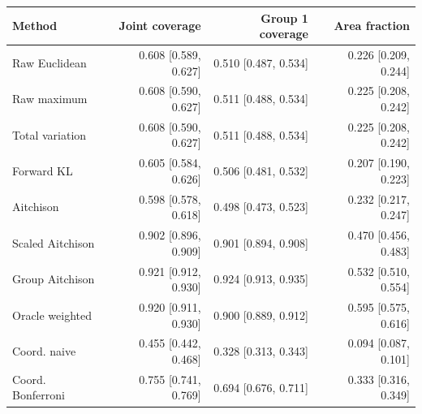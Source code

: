 \begin{tabular}{lrrr}
\toprule
Method & Joint coverage & Group 1 coverage & Area fraction \\
\midrule
Raw Euclidean & 0.608 [0.589, 0.627] & 0.510 [0.487, 0.534] & 0.226 [0.209, 0.244] \\
Raw maximum & 0.608 [0.590, 0.627] & 0.511 [0.488, 0.534] & 0.225 [0.208, 0.242] \\
Total variation & 0.608 [0.590, 0.627] & 0.511 [0.488, 0.534] & 0.225 [0.208, 0.242] \\
Forward KL & 0.605 [0.584, 0.626] & 0.506 [0.481, 0.532] & 0.207 [0.190, 0.223] \\
Aitchison & 0.598 [0.578, 0.618] & 0.498 [0.473, 0.523] & 0.232 [0.217, 0.247] \\
Scaled Aitchison & 0.902 [0.896, 0.909] & 0.901 [0.894, 0.908] & 0.470 [0.456, 0.483] \\
Group Aitchison & 0.921 [0.912, 0.930] & 0.924 [0.913, 0.935] & 0.532 [0.510, 0.554] \\
Oracle weighted & 0.920 [0.911, 0.930] & 0.900 [0.889, 0.912] & 0.595 [0.575, 0.616] \\
Coord. naive & 0.455 [0.442, 0.468] & 0.328 [0.313, 0.343] & 0.094 [0.087, 0.101] \\
Coord. Bonferroni & 0.755 [0.741, 0.769] & 0.694 [0.676, 0.711] & 0.333 [0.316, 0.349] \\
\bottomrule
\end{tabular}
